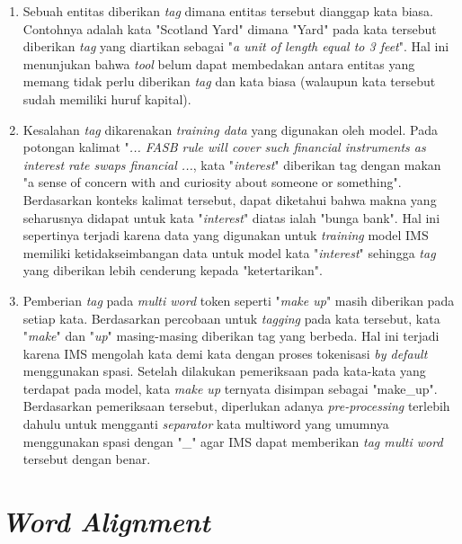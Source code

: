 \begin{enumerate}
	\item Sebuah entitas diberikan \textit{tag} dimana entitas tersebut dianggap kata biasa. Contohnya adalah kata "Scotland Yard" dimana "Yard" pada kata tersebut diberikan \textit{tag} yang diartikan sebagai "\textit{a unit of length equal to 3 feet}". Hal ini menunjukan bahwa \textit{tool} belum dapat membedakan antara entitas yang memang tidak perlu diberikan \textit{tag} dan kata biasa (walaupun kata tersebut sudah memiliki huruf kapital).
	\item Kesalahan \textit{tag} dikarenakan \textit{training data} yang digunakan oleh model. Pada potongan kalimat "\textit{... FASB rule will cover such financial instruments as interest rate swaps financial ...}, kata "\textit{interest}" diberikan tag dengan makan "a sense of concern with and curiosity about someone or something". Berdasarkan konteks kalimat tersebut, dapat diketahui bahwa makna yang seharusnya didapat untuk kata "\textit{interest}" diatas ialah "bunga bank". Hal ini sepertinya terjadi karena data yang digunakan untuk \textit{training} model IMS memiliki ketidakseimbangan data untuk model kata "\textit{interest}" sehingga \textit{tag} yang diberikan lebih cenderung kepada "ketertarikan".
	\item Pemberian \textit{tag} pada \textit{multi word} token seperti "\textit{make up}" masih diberikan pada setiap kata. Berdasarkan percobaan untuk \textit{tagging} pada kata tersebut, kata "\textit{make}" dan "\textit{up}" masing-masing diberikan tag yang berbeda. Hal ini terjadi karena IMS mengolah kata demi kata dengan proses tokenisasi \textit{by default} menggunakan spasi. Setelah dilakukan pemeriksaan pada kata-kata yang terdapat pada model, kata \textit{make up} ternyata disimpan sebagai "make\_up". Berdasarkan pemeriksaan tersebut, diperlukan adanya \textit{pre-processing} terlebih dahulu untuk mengganti \textit{separator} kata multiword yang umumnya menggunakan spasi dengan "\_" agar IMS dapat memberikan \textit{tag multi word} tersebut dengan benar.
\end{enumerate}

\section{\textit{Word Alignment}}

